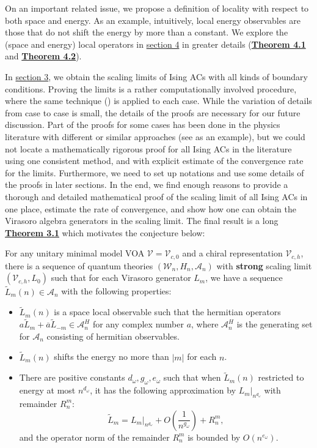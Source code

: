 \documentclass[twoside,11pt,titlepage]{amsart}
\newenvironment{customcnj}[1]
  {\renewcommand\theinnercustomcnj{#1}\innercustomcnj}
  {\endinnercustomcnj}
\renewcommand{\=}[1]{\stackrel{#1}{=}} %
\theoremstyle{definition}
\theoremstyle{remark}
\begin{document}
On an important related issue, we propose a definition of locality with respect to both space and energy. As an example, intuitively, local energy observables are those that do not shift the energy by more than a constant. We explore the (space and energy) local operators in \hyperref[4]{section 4} in greater details (\hyperref[thm4.1]{\textbf{Theorem 4.1}} and \hyperref[thm4.2]{\textbf{Theorem 4.2}}).

In \hyperref[3]{section 3}, we obtain the scaling limits of Ising ACs with all kinds of boundary conditions. Proving the limits is a rather computationally involved procedure, where the same technique (\cite{fendley2014free}) is applied to each case. While the variation of details from case to case is small, the details of the proofs are necessary for our future discussion. Part of the proofs for some cases has been done in the physics literature with different or similar approaches (see \cite{koo1994representations} as an example), but we could not locate a mathematically rigorous proof for all Ising ACs in the literature using one consistent method, and with explicit estimate of the convergence rate for the limits. Furthermore, we need to set up notations and use some details of the proofs in later sections.  In the end, we find enough reasons to provide a thorough and detailed mathematical proof of the scaling limit of all Ising ACs in one place, estimate the rate of convergence, and show how one can obtain the Virasoro algebra generators in the scaling limit. The final result is a long \hyperref[thm3.1]{\textbf{Theorem 3.1}} which motivates the conjecture below:

\begin{customcnj}{4.3}\label{cnj4.3rep}
For any unitary minimal model VOA $\mathcal{V}=\mathcal{V}_{c,0}$ and a chiral representation $\mathcal{V}_{c,h}$, there is a sequence of quantum theories $(\mathcal{W}_n, H_n, \mathcal{A}_n)$ with \textbf{strong} scaling limit $(\mathcal{V}_{c,h},L_0)$ such that for each Virasoro generator $L_m$, we have a sequence $\widetilde{L}_m(n) \in \mathcal{A}_n$ with the following properties:
\begin{itemize}
    \item $\widetilde{L}_m(n)$ is a space local observable such that the hermitian operators $a\widetilde{L}_m+\overline{a}\widetilde{L}_{-m} \in \mathcal{A}_n^H$ for any complex number $a$, where $\mathcal{A}_n^H$ is the generating set for $\mathcal{A}_n$ consisting of hermitian observables.
    \item  $\widetilde{L}_m(n)$ shifts the energy no more than $|m|$ for each $n$.
    \item There are positive constants $d_\omega,g_\omega,e_\omega$ such that when $\widetilde{L}_m(n)$ restricted to energy at most $n^{d_\omega}$, it has the following approximation by $L_m|_{n^{
    d_\omega}}$ with remainder $R_{n}^m$:
    $$\widetilde{L}_m=L_m|_{n^{d_\omega}}+O(\frac{1}{n^{g_\omega}})+R_{n}^m,$$
    and the operator norm of the remainder $R_{n}^m$ is bounded by $O(n^{e_\omega})$.
\end{itemize}
\end{customcnj}
\end{document}
